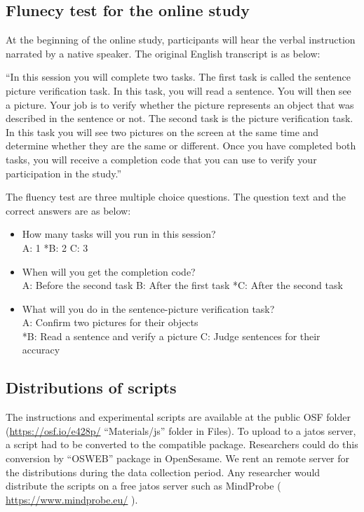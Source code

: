 \documentclass[
  man,floatsintext]{apa7}
\begin{document}
\hypertarget{flunecy-test-for-the-online-study}{%
\subsection{Flunecy test for the online study}\label{flunecy-test-for-the-online-study}}

At the beginning of the online study, participants will hear the verbal instruction narrated by a native speaker. The original English transcript is as below:

``In this session you will complete two tasks. The first task is called the sentence picture verification task. In this task, you will read a sentence. You will then see a picture. Your job is to verify whether the picture represents an object that was described in the sentence or not. The second task is the picture verification task. In this task you will see two pictures on the screen at the same time and determine whether they are the same or different. Once you have completed both tasks, you will receive a completion code that you can use to verify your participation in the study.''

The fluency test are three multiple choice questions. The question text and the correct answers are as below:

\begin{itemize}
\item
  How many tasks will you run in this session?\\
  A: 1
  *B: 2
  C: 3
\item
  When will you get the completion code?\\
  A: Before the second task
  B: After the first task
  *C: After the second task
\item
  What will you do in the sentence-picture verification task?\\
  A: Confirm two pictures for their objects\\
  *B: Read a sentence and verify a picture
  C: Judge sentences for their accuracy
\end{itemize}

\hypertarget{distributions-of-scripts}{%
\subsection{Distributions of scripts}\label{distributions-of-scripts}}

The instructions and experimental scripts are available at the public OSF folder (\url{https://osf.io/e428p/} ``Materials/js'' folder in Files). To upload to a jatos server, a script had to be converted to the compatible package. Researchers could do this conversion by ``OSWEB'' package in OpenSesame. We rent an remote server for the distributions during the data collection period. Any researcher would distribute the scripts on a free jatos server such as MindProbe ( \url{https://www.mindprobe.eu/} ).
\end{document}
